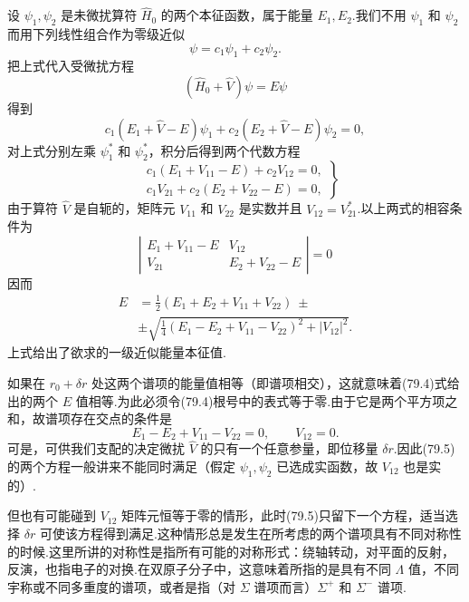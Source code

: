 设 $\psi_1,\psi_2$ 是未微扰算符 $\hat{H}_0$ 的两个本征函数，属于能量 $E_1,E_2$.我们不用 $\psi_1$ 和 $\psi_2$ 而用下列线性组合作为零级近似
\begin{equation}
  \psi=c_1\psi_1+c_2\psi_2.
\end{equation}
把上式代入受微扰方程
\begin{equation}
  (\hat{H}_0+\hat{V})\psi=E\psi
\end{equation}
得到
\begin{equation*}
  c_1(E_1+\hat{V}-E)\psi_1+c_2(E_2+\hat{V}-E)\psi_2=0,
\end{equation*}
对上式分别左乘 $\psi_1^*$ 和 $\psi_2^*$，积分后得到两个代数方程
\begin{equation}
\left.\begin{aligned}
  &c_1(E_1+V_{11}-E)+c_2V_{12}=0,\\
  &c_1V_{21}+c_2(E_2+V_{22}-E)=0,
\end{aligned}\right\}
\end{equation}
由于算符 $\hat{V}$ 是自轭的，矩阵元 $V_{11}$ 和 $V_{22}$ 是实数并且 $V_{12}=V_{21}^*$.以上两式的相容条件为
\begin{equation*}
  \left|\begin{array}{cc}
    E_1+V_{11}-E & V_{12}\\
    V_{21} & E_2+V_{22}-E
  \end{array}\right|=0
\end{equation*}
因而
\begin{equation}
\begin{aligned}
  E&=\frac{1}{2}(E_1+E_2+V_{11}+V_{22})\ \pm\\
  &\pm\sqrt{\frac{1}{4}(E_1-E_2+V_{11}-V_{22})^2+|V_{12}|^2}.
\end{aligned}
\end{equation}
上式给出了欲求的一级近似能量本征值.

如果在 $r_0+\delta r$ 处这两个谱项的能量值相等（即谱项相交），这就意味着(79.4)式给出的两个 $E$ 值相等.为此必须令(79.4)根号中的表式等于零.由于它是两个平方项之和，故谱项存在交点的条件是
\begin{equation}
  E_1-E_2+V_{11}-V_{22}=0,\qquad V_{12}=0.
\end{equation}
可是，可供我们支配的决定微扰 $\hat{V}$ 的只有一个任意参量，即位移量 $\delta r$.因此(79.5)的两个方程一般讲来不能同时满足（假定 $\psi_1,\psi_2$ 已选成实函数，故 $V_{12}$ 也是实的）.

但也有可能碰到 $V_{12}$ 矩阵元恒等于零的情形，此时(79.5)只留下一个方程，适当选择 $\delta r$ 可使该方程得到满足.这种情形总是发生在所考虑的两个谱项具有不同对称性的时候.这里所讲的对称性是指所有可能的对称形式：绕轴转动，对平面的反射，反演，也指电子的对换.在双原子分子中，这意味着所指的是具有不同 $\Lambda$ 值，不同宇称或不同多重度的谱项，或者是指（对 $\Sigma$ 谱项而言）$\Sigma^+$ 和 $\Sigma^-$ 谱项.

